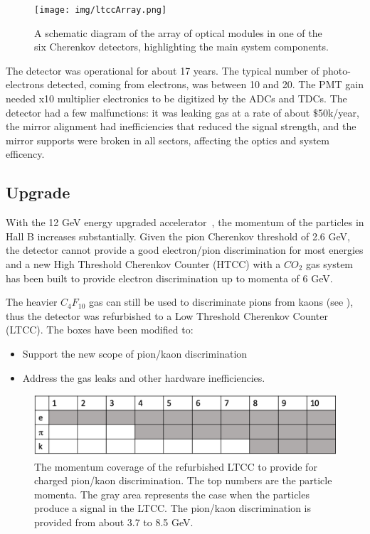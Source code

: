 \begin{figure}[ht]
	\centering
	\texttt{[image: img/ltccArray.png]}
	\caption{A schematic diagram of the array of optical modules in one of the six Cherenkov detectors, highlighting the main system components.}
	\label{fig:ltccArray}
\end{figure}

The detector was operational for about 17 years. The typical number of photo-electrons detected, coming from electrons, was between 10 and 20.
The PMT gain needed x10 multiplier electronics to be digitized by the ADCs and TDCs.
The detector had a few malfunctions: it was leaking gas at a rate of about $\$$50k/year, the mirror alignment had inefficiencies that reduced
the signal strength, and the mirror supports were broken in all sectors, affecting the optics and system efficency.


\subsection{Upgrade}

With the 12 GeV energy upgraded accelerator~\cite{TDR12}, the momentum of the particles in Hall B increases substantially.
Given the pion Cherenkov threshold of 2.6 GeV, the detector cannot provide a good electron/pion discrimination for most energies and a new
High Threshold Cherenkov Counter (HTCC) with a $CO_2$ gas system has been built to provide electron discrimination up to momenta of 6 GeV.

The heavier $C_4F_{10}$ gas can still be used to discriminate pions from kaons (see ), thus the detector was refurbished
to a Low Threshold Cherenkov Counter (LTCC).
The boxes have been modified to:

\begin{itemize}
	\item Support the new scope of pion/kaon discrimination
	\item Address the gas leaks and other hardware inefficiencies.
\end{itemize}

\begin{figure}[hb]
	\centering
	\includegraphics[width=0.99\columnwidth,keepaspectratio]{img/newScope.png}
	\caption{The momentum coverage of the refurbished LTCC to provide for charged pion/kaon discrimination.
             The top numbers are the particle momenta.
		     The gray area represents the case when the particles produce a signal in the LTCC.
			 The pion/kaon discrimination is provided from about 3.7 to 8.5 GeV.}
	\label{fig:newScope}
\end{figure}
